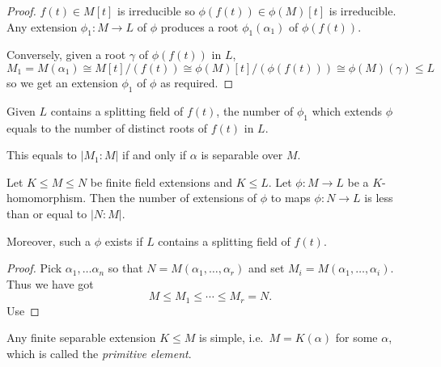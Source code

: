 \documentclass[a4paper]{article}
\begin{document}
\begin{proof}
  \(f(t) \in M[t]\) is irreducible so \(\phi(f(t)) \in \phi(M)[t]\) is irreducible. Any extension \(\phi_1: M \to L\) of \(\phi\) produces a root \(\phi_1(\alpha_1)\) of \(\phi(f(t))\).

  Conversely, given a root \(\gamma\) of \(\phi(f(t))\) in \(L\),
  \[
    M_1 = M(\alpha_1) \cong M[t]/(f(t)) \cong \phi(M)[t]/(\phi(f(t))) \cong \phi(M)(\gamma) \leq L
  \]
  so we get an extension \(\phi_1\) of \(\phi\) as required.
\end{proof}

\begin{corollary}
  Given \(L\) contains a splitting field of \(f(t)\), the number of \(\phi_1\) which extends \(\phi\) equals to the number of distinct roots of \(f(t)\) in \(L\).

  This equals to \(|M_1:M|\) if and only if \(\alpha\) is separable over \(M\).
\end{corollary}

\begin{corollary}
  Let \(K \leq M \leq N\) be finite field extensions and \(K \leq L\). Let \(\phi: M \to L\) be a \(K\)-homomorphism. Then the number of extensions of \(\phi\) to maps \(\phi: N \to L\) is less than or equal to \(|N:M|\).

  Moreover, such a \(\phi\) exists if \(L\) contains a splitting field of \(f(t)\).
\end{corollary}

\begin{proof}
  Pick \(\alpha_1, \dots \alpha_n\) so that \(N = M(\alpha_1, \dots, \alpha_r)\) and set \(M_i = M(\alpha_1, \dots, \alpha_i)\). Thus we have got
  \[
    M \leq M_1 \leq \cdots \leq M_r = N.
  \]
  Use
\end{proof}


\begin{theorem}
  \label{thm:primitive}
  Any finite separable extension \(K \leq M\) is simple, i.e.\ \(M = K(\alpha)\) for some \(\alpha\), which is called the \emph{primitive element}.
\end{theorem}
\end{document}
